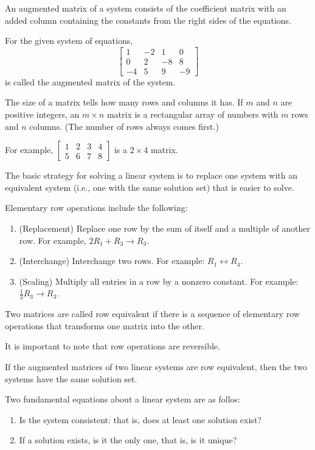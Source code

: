 \documentclass[../linalg.tex]{subfiles}
\begin{document}
An augmented matrix of a system consists of the coefficient matrix with an added column containing the constants from the right sides of the equations.

For the given system of equations,
\[ \begin{bmatrix}
    1&-2&1&0\\ 0&2&-8&8\\ -4&5&9&-9
\end{bmatrix} \]
is called the augmented matrix of the system.

The size of a matrix tells how many rows and columns it has. If $m$ and $n$ are positive integers, an $m\times n$ matrix is a rectangular array of numbers with $m$ rows and $n$ columns. (The number of rows always comes first.)

For example, $\begin{bmatrix}
    1&2&3&4\\ 5&6&7&8
\end{bmatrix}$ is a $2\times 4$ matrix.

The basic strategy for solving a linear system is to replace one system with an equivalent system (i.e., one with the same solution set) that is easier to solve.

Elementary row operations include the following:
\begin{enumerate}
    \item (Replacement) Replace one row by the sum of itself and a multiple of another row. For example, $2R_1+R_3 \rightarrow R_3$.
    \item (Interchange) Interchange two rows. For example: $R_1\leftrightarrow R_4$.
    \item (Scaling) Multiply all entries in a row by a nonzero constant. For example: $\frac{1}{3}R_3\rightarrow R_3$.
\end{enumerate}

Two matrices are called row equivalent if there is a sequence of elementary row operations that transforms one matrix into the other.

It is important to note that row operations are reversible.

If the augmented matrices of two linear systems are row equivalent, then the two systems have the same solution set.

Two fundamental equations about a linear system are as follos:
\begin{enumerate}
    \item Is the system consistent: that is, does at least one solution exist?
    \item If a solution exists, is it the only one, that is, is it unique?
\end{enumerate}
\end{document}

